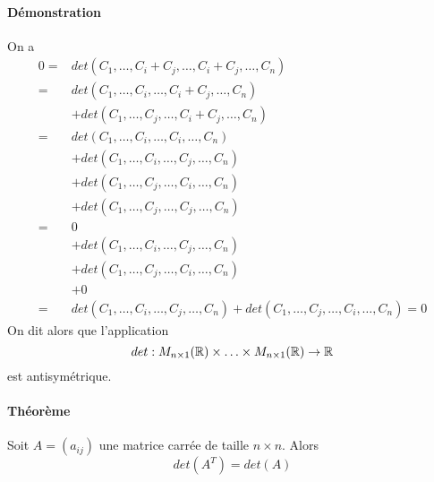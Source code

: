 \paragraph{Démonstration} On a
\begin{eqnarray*}
  0 =& det(C_1, \ldots, C_i+C_j, \ldots, C_i+C_j, \ldots, C_n) \\
    =& det(C_1, \ldots, C_i, \ldots, C_i+C_j, \ldots, C_n) \\
    &+ det(C_1, \ldots, C_j, \ldots, C_i+C_j, \ldots, C_n) \\
    =& det(C_1, \ldots, C_i, \ldots, C_i, \ldots, C_n) \\
    &+ det(C_1, \ldots, C_i, \ldots, C_j, \ldots, C_n) \\
    &+ det(C_1, \ldots, C_j, \ldots, C_i, \ldots, C_n) \\
    &+ det(C_1, \ldots, C_j, \ldots, C_j, \ldots, C_n) \\
    =& 0 \\
    &+ det(C_1, \ldots, C_i, \ldots, C_j, \ldots, C_n) \\
    &+ det(C_1, \ldots, C_j, \ldots, C_i, \ldots, C_n) \\
    &+ 0 \\
    =& det(C_1, \ldots, C_i, \ldots, C_j, \ldots, C_n) + det(C_1, \ldots, C_j, \ldots, C_i, \ldots, C_n) = 0
\end{eqnarray*}
On dit alors que l'application 
$$det: M_{n \times 1}(\mathbb{R}) \times \ldots \times M_{n\times 1}(\mathbb{R}) \rightarrow \mathbb{R}$$
est antisymétrique.

\paragraph{Théorème} Soit $A =(a_{ij})$ une matrice carrée de taille $n\times n$. Alors
$$det(A^{T}) = det(A)$$

